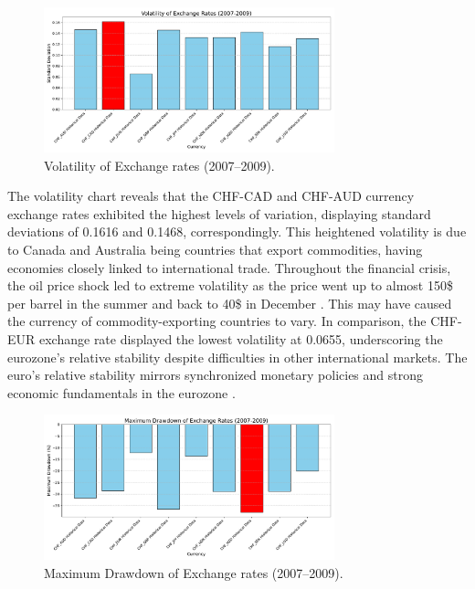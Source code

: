 \documentclass[11pt,a4paper,english,oneside]{book}
\begin{document}
\begin{figure}[h!]
    \centering
    \includegraphics[width=0.75\textwidth]{../../images/volatility_2007_2009.pdf}
    \caption{Volatility of Exchange rates (2007--2009).}
    \label{fig:volatility_2007_2009}
\end{figure}

The volatility chart reveals that the CHF-CAD and CHF-AUD currency exchange rates exhibited the highest levels of variation, displaying standard deviations of 0.1616 and 0.1468, correspondingly. This heightened volatility is due to Canada and Australia being countries that export commodities, having economies closely linked to international trade. Throughout the financial crisis, the oil price shock led to extreme volatility as the price went up to almost 150\$ per barrel in the summer and back to 40\$ in December \parencite{behr20092008}. This may have caused the currency of commodity-exporting countries to vary. In comparison, the CHF-EUR exchange rate displayed the lowest volatility at 0.0655, underscoring the eurozone's relative stability despite difficulties in other international markets. The euro's relative stability mirrors synchronized monetary policies and strong economic fundamentals in the eurozone \parencite{lane2012european}.

\begin{figure}[h!]
    \centering
    \includegraphics[width=0.75\textwidth]{../../images/maximum_drawdown_2007_2009.pdf}
    \caption{Maximum Drawdown of Exchange rates (2007--2009).}
    \label{fig:maximum_drawdown_2007_2009}
\end{figure}
\end{document}
